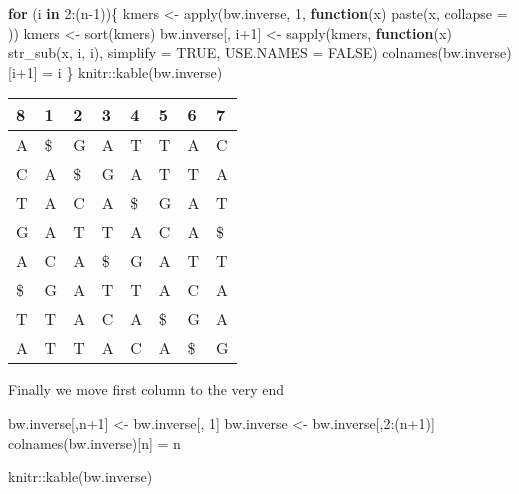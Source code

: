 \documentclass[
]{book}
\newenvironment{Shaded}{\begin{snugshade}}{\end{snugshade}}
\newcommand{\AttributeTok}[1]{\textcolor[rgb]{0.77,0.63,0.00}{#1}}
\newcommand{\ConstantTok}[1]{\textcolor[rgb]{0.00,0.00,0.00}{#1}}
\newcommand{\ControlFlowTok}[1]{\textcolor[rgb]{0.13,0.29,0.53}{\textbf{#1}}}
\newcommand{\DecValTok}[1]{\textcolor[rgb]{0.00,0.00,0.81}{#1}}
\newcommand{\FunctionTok}[1]{\textcolor[rgb]{0.00,0.00,0.00}{#1}}
\newcommand{\NormalTok}[1]{#1}
\newcommand{\OtherTok}[1]{\textcolor[rgb]{0.56,0.35,0.01}{#1}}
\newcommand{\SpecialCharTok}[1]{\textcolor[rgb]{0.00,0.00,0.00}{#1}}
\newcommand{\StringTok}[1]{\textcolor[rgb]{0.31,0.60,0.02}{#1}}
\begin{document}
\begin{Shaded}
\begin{Highlighting}[]
\ControlFlowTok{for}\NormalTok{ (i }\ControlFlowTok{in} \DecValTok{2}\SpecialCharTok{:}\NormalTok{(n}\DecValTok{{-}1}\NormalTok{))\{}
\NormalTok{  kmers             }\OtherTok{\textless{}{-}} \FunctionTok{apply}\NormalTok{(bw.inverse, }\DecValTok{1}\NormalTok{, }
                             \ControlFlowTok{function}\NormalTok{(x) }\FunctionTok{paste}\NormalTok{(x, }\AttributeTok{collapse =} \StringTok{\textquotesingle{}\textquotesingle{}}\NormalTok{))}
\NormalTok{  kmers             }\OtherTok{\textless{}{-}} \FunctionTok{sort}\NormalTok{(kmers)}
\NormalTok{  bw.inverse[, i}\SpecialCharTok{+}\DecValTok{1}\NormalTok{] }\OtherTok{\textless{}{-}} \FunctionTok{sapply}\NormalTok{(kmers, }\ControlFlowTok{function}\NormalTok{(x) }\FunctionTok{str\_sub}\NormalTok{(x, i, i), }
                              \AttributeTok{simplify =} \ConstantTok{TRUE}\NormalTok{, }\AttributeTok{USE.NAMES =} \ConstantTok{FALSE}\NormalTok{)}
  \FunctionTok{colnames}\NormalTok{(bw.inverse)[i}\SpecialCharTok{+}\DecValTok{1}\NormalTok{] }\OtherTok{=}\NormalTok{ i}
\NormalTok{\}}
\NormalTok{knitr}\SpecialCharTok{::}\FunctionTok{kable}\NormalTok{(bw.inverse)}
\end{Highlighting}
\end{Shaded}

\begin{tabular}{l|l|l|l|l|l|l|l}
\hline
8 & 1 & 2 & 3 & 4 & 5 & 6 & 7\\
\hline
A & \$ & G & A & T & T & A & C\\
\hline
C & A & \$ & G & A & T & T & A\\
\hline
T & A & C & A & \$ & G & A & T\\
\hline
G & A & T & T & A & C & A & \$\\
\hline
A & C & A & \$ & G & A & T & T\\
\hline
\$ & G & A & T & T & A & C & A\\
\hline
T & T & A & C & A & \$ & G & A\\
\hline
A & T & T & A & C & A & \$ & G\\
\hline
\end{tabular}

Finally we move first column to the very end

\begin{Shaded}
\begin{Highlighting}[]
\NormalTok{bw.inverse[,n}\SpecialCharTok{+}\DecValTok{1}\NormalTok{] }\OtherTok{\textless{}{-}}\NormalTok{ bw.inverse[, }\DecValTok{1}\NormalTok{]}
\NormalTok{bw.inverse       }\OtherTok{\textless{}{-}}\NormalTok{ bw.inverse[,}\DecValTok{2}\SpecialCharTok{:}\NormalTok{(n}\SpecialCharTok{+}\DecValTok{1}\NormalTok{)]}
\FunctionTok{colnames}\NormalTok{(bw.inverse)[n] }\OtherTok{=}\NormalTok{ n}

\NormalTok{knitr}\SpecialCharTok{::}\FunctionTok{kable}\NormalTok{(bw.inverse)}
\end{Highlighting}
\end{Shaded}
\end{document}
